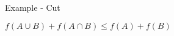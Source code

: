 \begin{frame}{Example - Cut}
\begin{center}
$f(A \cup B) + f(A \cap B) \leq f(A) + f(B)$
\end{center}
\begin{center}

\end{center}
\end{frame}